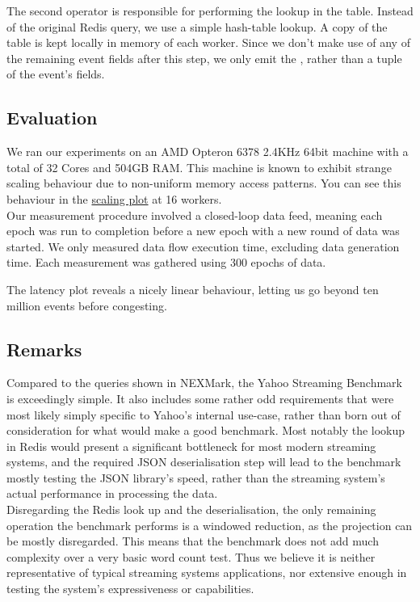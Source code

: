 The second  operator is responsible for performing the lookup in the  table. Instead of the original Redis query, we use a simple hash-table lookup. A copy of the table is kept locally in memory of each worker. Since we don't make use of any of the remaining event fields after this step, we only emit the , rather than a tuple of the event's fields.

\subsection{Evaluation}
We ran our experiments on an AMD Opteron 6378 2.4KHz 64bit machine with a total of 32 Cores and 504GB RAM. This machine is known to exhibit strange scaling behaviour due to non-uniform memory access patterns. You can see this behaviour in the \hyperref[figure:ysb-scaling]{scaling plot} at 16 workers. \\

Our measurement procedure involved a closed-loop data feed, meaning each epoch was run to completion before a new epoch with a new round of data was started. We only measured data flow execution time, excluding data generation time. Each measurement was gathered using 300 epochs of data. \\


The latency plot reveals a nicely linear behaviour, letting us go beyond ten million events before congesting.

\subsection{Remarks}\label{section:ysb-remarks}
Compared to the queries shown in NEXMark, the Yahoo Streaming Benchmark is exceedingly simple. It also includes some rather odd requirements that were most likely simply specific to Yahoo's internal use-case, rather than born out of consideration for what would make a good benchmark. Most notably the lookup in Redis would present a significant bottleneck for most modern streaming systems, and the required JSON deserialisation step will lead to the benchmark mostly testing the JSON library's speed, rather than the streaming system's actual performance in processing the data. \\

Disregarding the Redis look up and the deserialisation, the only remaining operation the benchmark performs is a windowed reduction, as the projection can be mostly disregarded. This means that the benchmark does not add much complexity over a very basic word count test. Thus we believe it is neither representative of typical streaming systems applications, nor extensive enough in testing the system's expressiveness or capabilities.

